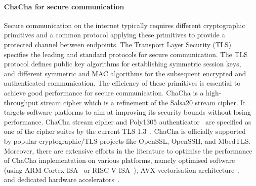 \paragraph{ChaCha for secure communication}
Secure communication on the internet typically requires different cryptographic primitives and a common protocol applying these primitives to provide a protected channel between endpoints.
The Transport Layer Security (TLS) specifies the leading and standard protocols for secure communication.
The TLS protocol defines public key algorithms for establishing symmetric session keys, and different symmetric and MAC algorithms for the subsequent encrypted and authenticated communication.
The efficiency of these primitives is essential to achieve good performance for secure communication.
ChaCha is a high-throughput stream cipher which is a refinement of the Salsa20 stream cipher. It targets software platforms to aim at improving its security bounds without losing performance. ChaCha stream cipher and Poly1305 authenticator~\cite{RFC:16} are specified as one of the cipher suites by the current TLS 1.3~\cite[Section 9.1]{RFC:18:8446}.
ChaCha is officially supported by popular cryptographic/TLS projects like OpenSSL, OpenSSH, and MbedTLS.
Moreover, there are extensive efforts in the literature to optimise the performance of ChaCha implementation on various platforms, namely optimised software (using ARM Cortex ISA~\cite{SSS:17} or RISC-V ISA~\cite{Sto:19}), AVX vectorisation architecture~\cite{GolGue:14}, and dedicated hardware accelerators~\cite{KLA:19,PRH:19}.  

